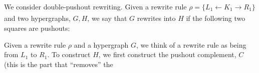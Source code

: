 We consider double-pushout rewriting. Given a rewrite rule $\rho = \{L_1 \xleftarrow{} K_1 \xrightarrow[]{} R_1\}$ and two hypergraphs, $G, H$, we say that $G$ rewrites into $H$ if the following two squares are pushouts: 


Given a rewrite rule $\rho$ and a hypergraph $G$, we think of a rewrite rule as being from $L_1$ to $R_1$. To construct $H$, we first construct the pushout complement, $C$ (this is the part that ``removes'' the 